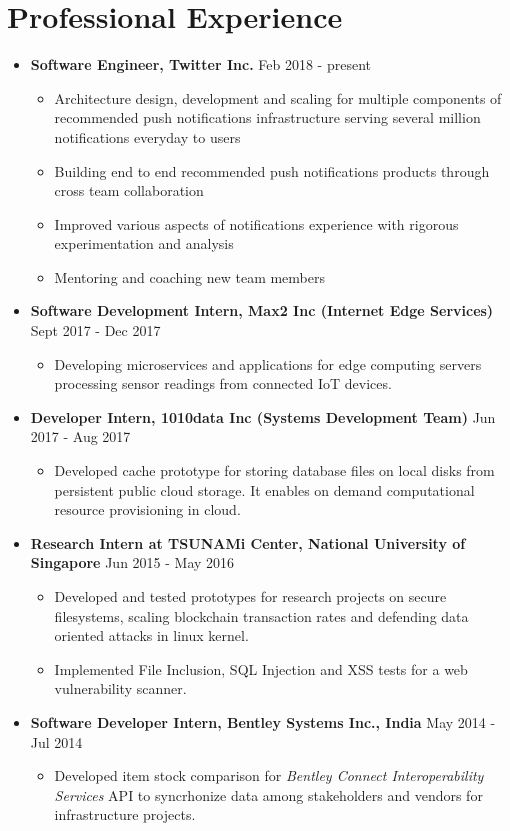 \documentclass{article}
\newcommand{\bi}{\vspace{-1mm}\begin{itemize}[align=left,leftmargin=*, rightmargin=80pt, labelindent=0pt,labelsep=2pt, label={-}, nosep]}
\newcommand{\ei}{\end{itemize}}
\begin{document}
\section*{Professional Experience}
\begin{itemize}

    \item \textbf{Software Engineer, Twitter Inc.} {\hfill Feb 2018 - present}
    \bi
        \item Architecture design, development and scaling for multiple components of recommended push notifications infrastructure serving several million notifications everyday to users
        \item Building end to end recommended push notifications products through cross team collaboration
        \item Improved various aspects of notifications experience with rigorous experimentation and analysis
        \item Mentoring and coaching new team members
    \ei

    \item \textbf{Software Development Intern, Max2 Inc (Internet Edge Services)} {\hfill Sept 2017 - Dec 2017}
    \bi
        \item Developing microservices and applications for edge computing servers processing sensor readings from connected IoT devices.
    \ei

    \item \textbf{Developer Intern, 1010data Inc (Systems Development Team)} {\hfill Jun 2017 - Aug 2017}
    \bi
        \item Developed cache prototype for storing database files on local disks from persistent public cloud storage. It enables on demand computational resource provisioning in cloud.
    \ei

    \item \textbf{Research Intern at TSUNAMi Center, National University of Singapore} {\hfill Jun 2015 - May 2016}
    \bi
        \item Developed and tested prototypes for research projects on secure filesystems, scaling blockchain transaction rates and defending data oriented attacks in linux kernel.

        \item Implemented File Inclusion, SQL Injection and XSS tests for a web vulnerability scanner.
    \ei
    
    \item \textbf{Software Developer Intern, Bentley Systems Inc., India} {\hfill May 2014 - Jul 2014}
    \bi
        \item Developed item stock comparison for \textit{Bentley Connect Interoperability Services} API to syncrhonize data among stakeholders and vendors for infrastructure projects.
    \ei
\end{itemize}
\end{document}
